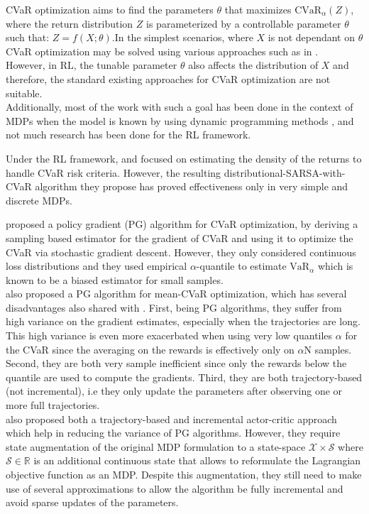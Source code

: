 CVaR optimization aims to find the parameters $\theta$ that maximizes 
$\text{CVaR}_\alpha (Z)$, where the return distribution $Z$ is parameterized by a 
controllable parameter $\theta$ such that: $Z = f(X; \theta)$.In the simplest scenarios, 
where $X$ is not dependant on $\theta$ CVaR optimization may 
be solved using various approaches such as in \citet{Rockafellar2000}.\\
However, in RL, the tunable parameter $\theta$ also affects the 
distribution of $X$ and therefore, the standard existing approaches for CVaR optimization 
are not suitable.\\
Additionally, most of the work with such a goal has been done in the context of MDPs when
the model is known  by using dynamic programming methods \citep{Chow2015, Petrik2012},
and not much research has been done for the RL framework.

Under the RL framework, \citet{Morimura2010a} and \citet{Morimura2010b}
focused on estimating the density of the returns
to handle CVaR risk criteria. However, the resulting distributional-SARSA-with-CVaR algorithm
they propose has  proved  effectiveness  only  in  very simple  and discrete MDPs.

\citet{Tamar2015a} proposed a policy gradient (PG) algorithm for CVaR optimization, by
deriving a sampling based estimator for the gradient of CVaR and using it to optimize the
CVaR via stochastic gradient descent. However, they only considered continuous loss distributions
and they used empirical $\alpha$-quantile to estimate 
$\text{VaR}_\alpha$ which is known to be a biased estimator for small samples.\\
\citet{Chow2014} also proposed a PG algorithm for mean-CVaR optimization, which has several
disadvantages also shared with \citet{Tamar2015}. First, being PG algorithms,
they suffer from high variance on the gradient estimates, especially when the trajectories
are long. This high variance is even more exacerbated when using very low quantiles $\alpha$ for the CVaR 
since the averaging on the rewards is effectively only on $\alpha$N samples.
Second, they are both very sample inefficient since only the rewards below the quantile
are used to compute the gradients. Third, they are both trajectory-based (not incremental), 
i.e they only update the parameters after observing one or more full trajectories.\\
\citet{Chow2014} also proposed both a trajectory-based and incremental actor-critic
approach which help in reducing the variance of PG algorithms. However, they require
state augmentation of the original MDP formulation to a state-space
$\mathcal{X} \times \mathcal{S}$ where $\mathcal{S} \in \mathbb R$ is an additional continuous
state that allows to reformulate the Lagrangian objective function as an MDP. Despite this augmentation,
they still need to make use of several approximations to allow the algorithm be fully incremental and 
avoid sparse updates of the parameters. 

